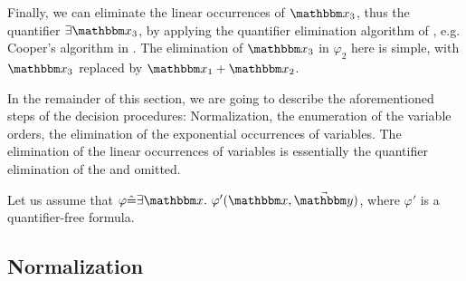 {Finally, we can eliminate the linear occurrences of $\ivarx_3$, thus the quantifier $\exists \ivarx_3$, by applying the quantifier elimination algorithm of {\pa}, e.g. Cooper's algorithm in \cite{Cooper72}. The elimination of $\ivarx_3$ in $\varphi_2$ here is simple, with $\ivarx_3$ replaced by $\ivarx_1 + \ivarx_2$. 

In the remainder of this section, we are going to describe the aforementioned steps of the decision procedures: Normalization, the enumeration of the variable orders, 
the elimination of the exponential occurrences of variables. The elimination of the  linear occurrences of variables is essentially the quantifier elimination of the {\pa} and omitted.

Let us assume that $\varphi \Def \exists \ivarx.\ \varphi'(\ivarx, \vec{\ivary})$, where $\varphi'$ is a quantifier-free formula. 


}
\subsection{Normalization}\label{qe-norm}

